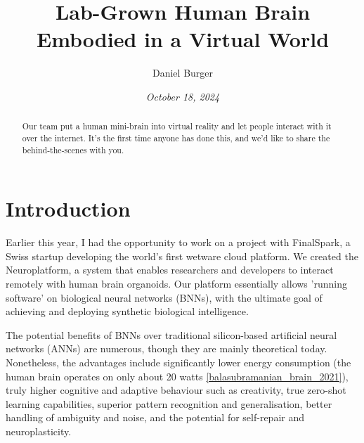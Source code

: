\documentclass[10pt]{article}
\begin{document}
\setlength{\footskip}{65pt}


\title{\textbf{Lab-Grown Human Brain \\ Embodied in a Virtual World}}
\author[1]{Daniel Burger}
\date{\textit{October 18, 2024}}
\maketitle
\thispagestyle{empty}

\begin{sloppypar}
  \begin{abstract}
    Our team put a human mini-brain into virtual reality and let people interact with it over the internet. It's the first time anyone has done this, and we'd like to share the behind-the-scenes with you.
  \end{abstract}

  \pagebreak
  \tableofcontents
  \pagebreak
  \listoffigures
  \pagebreak
  \listoftables
  \pagebreak
  \lstlistoflistings
  \pagebreak


  \section{Introduction}
  \label{sec:introduction}

  Earlier this year, I had the opportunity to work on a project with FinalSpark, a Swiss startup developing the world's first wetware cloud platform. We created the Neuroplatform, a system that enables researchers and developers to interact remotely with human brain organoids. Our platform essentially allows 'running software' on biological neural networks (BNNs), with the ultimate goal of achieving and deploying synthetic biological intelligence.

  The potential benefits of BNNs over traditional silicon-based artificial neural networks (ANNs) are numerous, though they are mainly theoretical today. Nonetheless, the advantages include significantly lower energy consumption (the human brain operates on only about 20 watts \autoref{balasubramanian_brain_2021}), truly higher cognitive and adaptive behaviour such as creativity, true zero-shot learning capabilities, superior pattern recognition and generalisation, better handling of ambiguity and noise, and the potential for self-repair and neuroplasticity.


\end{sloppypar}
\end{document}

